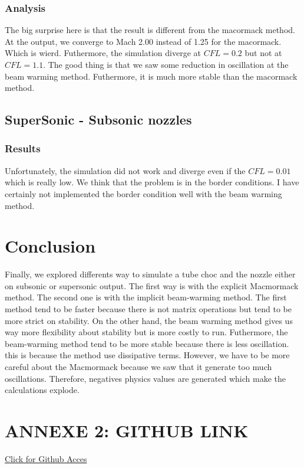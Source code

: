\documentclass[12pt]{article}
\begin{document}
\subsubsection{Analysis}

The big surprise here is that the result is different from the macormack method. At the output, we converge to 
Mach 2.00 instead of 1.25 for the macormack. Which is wierd. Futhermore, the simulation diverge at $CFL = 0.2$ but not at
$CFL = 1.1$. The good thing is that we saw some reduction in oscillation at the beam warming method. Futhermore, it is much 
more stable than the macormack method. 

\subsection{SuperSonic - Subsonic nozzles}

\subsubsection{Results}
Unfortunately, the simulation did not work and diverge even if the $CFL = 0.01$ which is really low. We think that the problem
is in the border conditions. I have certainly not implemented the border condition well with the beam warming method. 

\section{Conclusion}
Finally, we explored differents way to simulate a tube choc and the nozzle either on subsonic or supersonic output. The first
way is with the explicit Macmormack method. The second one is with the implicit beam-warming method. The first method tend to be faster 
because there is not matrix operations but tend to be more strict on stability. On the other hand, the beam warming method gives us 
way more flexibility about stability but is more costly to run. Futhermore, the beam-warming method tend to be more stable because there is less oscillation.
this is because the method use dissipative terms. However, we have to be more careful about the Macmormack because we saw that it generate too much oscillations. Therefore,
negatives physics values are generated which make the calculations explode. 

\section{ANNEXE 2: GITHUB LINK}

\href{https://github.com/Kenesis69/MEC_6602E_HOMEWORK_2}{Click for Github Acces}
\end{document}
